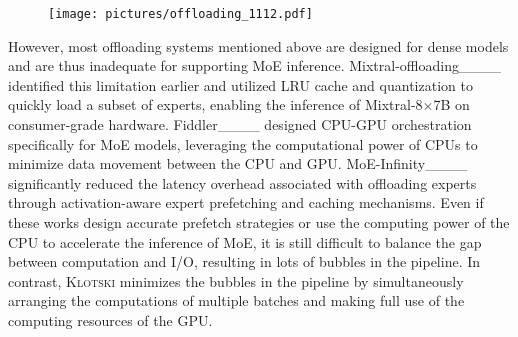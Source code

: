 \begin{figure}[t]
  \centering
  \texttt{[image: pictures/offloading\_1112.pdf]}
  \caption{}
  \label{figure:offloading}
\end{figure}

However, most offloading systems mentioned above are designed for dense models and are thus inadequate for supporting MoE inference. Mixtral-offloading____ identified this limitation earlier and utilized LRU cache and quantization to quickly load a subset of experts, enabling the inference of Mixtral-8$\times$7B on consumer-grade hardware. Fiddler____ designed CPU-GPU orchestration specifically for MoE models, leveraging the computational power of CPUs to minimize data movement between the CPU and GPU. MoE-Infinity____ significantly reduced the latency overhead associated with offloading experts through activation-aware expert prefetching and caching mechanisms. Even if these works design accurate prefetch strategies or use the computing power of the CPU to accelerate the inference of MoE, it is still difficult to balance the gap between computation and I/O, resulting in lots of bubbles in the pipeline. In contrast, \textsc{Klotski} minimizes the bubbles in the pipeline by simultaneously arranging the computations of multiple batches and making full use of the computing resources of the GPU.